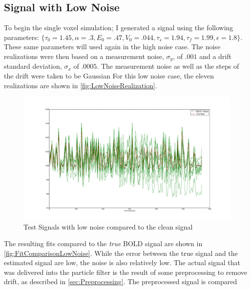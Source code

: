 \subsection{Signal with Low Noise}

To begin the single voxel simulation; I generated a signal using the following parameters:
$\{\tau_0 = 1.45, \alpha = .3, E_0 = .47, V_0 = .044, \tau_s = 1.94, \tau_f = 1.99, \epsilon = 1.8\}$.
These same parameters will used again in the high noise case. The noise realizations were
then based on a measurement noise, $\sigma_y$, of $.001$ and a drift standard deviation,
$\sigma_x$ of $.0005$. The measurement noise as well as the steps of the drift
were taken to be Gaussian
For this low noise case, the eleven realizations are shown in \autoref{fig:LowNoiseRealization}.
\begin{figure}
\label{fig:LowNoiseRealization}
\includegraphics[trim=6cm 3cm 6cm 3cm,width=16cm]{images/realization_lownoise}
\caption{Test Signals with low noise compared to the clean signal}
\end{figure}
The resulting fits compared to the \emph{true} BOLD signal are shown in \autoref{fig:FitComparisonLowNoise}.
While the error between the true signal and the estimated signal are low, the noise
is also relatively low. The actual signal that was delivered into the particle filter
is the result of some preprocessing to remove drift, as described in 
\autoref{sec:Preprocessing}. The preprocessed signal is compared
